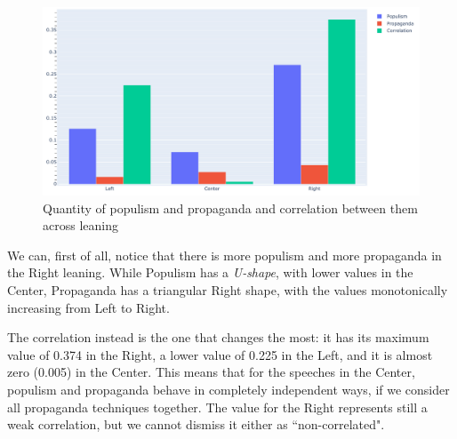 \begin{figure}[!htbp]
    \centering
    \includegraphics[width=\linewidth]{figures/populism_propaganda_quantities_by_leaning.pdf}
    \caption{Quantity of populism and propaganda and correlation between them across leaning}
    \label{fig:populism_propaganda_quantities_by_leaning}
\end{figure}

We can, first of all, notice that there is more populism and more propaganda in the Right leaning.
While Populism has a \emph{U-shape}, with lower values in the Center, Propaganda has a triangular Right shape, with the values monotonically increasing from Left to Right.

The correlation instead is the one that changes the most: it has its maximum value of 0.374 in the Right, a lower value of 0.225 in the Left, and it is almost zero (0.005) in the Center.
This means that for the speeches in the Center, populism and propaganda behave in completely independent ways, if we consider all propaganda techniques together.
The value for the Right represents still a weak correlation, but we cannot dismiss it either as ``non-correlated".




